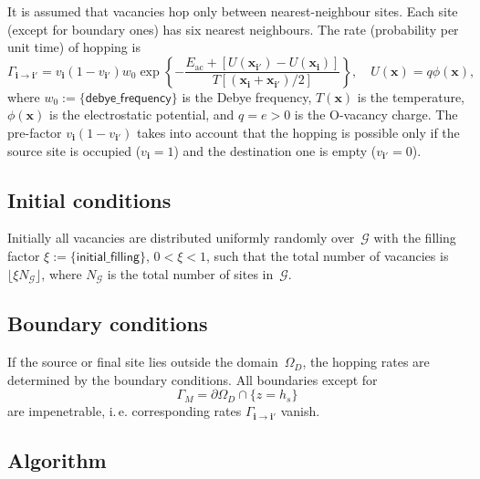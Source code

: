 \documentclass[10pt]{article}
\renewcommand{\vec}[1]{\mathbf{#1}}
\newcommand{\vi}{\vec{i}}
\newcommand{\vx}{\vec{x}}
\begin{document}
It is assumed that vacancies hop only between nearest-neighbour sites. Each site
(except for boundary ones) has six nearest neighbours. The rate (probability per
unit time) of hopping is
\begin{equation}
	\Gamma_{\vi \to \vi'} = v_\vi (1 - v_{\vi'}) w_0
	\exp \left\{
	-\frac{E_{\mathrm{ac}} + [U(\vx_{\vi'}) - U(\vx_\vi)]}
	{T[(\vx_\vi + \vx_{\vi'}) / 2]}
	\right\}, \quad U(\vx) = q \phi(\vx),
\end{equation}
where $w_0 := \{ \mathsf{debye\_frequency} \}$ is the Debye frequency, $T(\vx)$
is the temperature, $\phi(\vx)$ is the electrostatic potential, and $q = e > 0$
is the O-vacancy charge. The pre-factor $v_\vi (1 - v_{\vi'})$ takes into account
that the hopping is possible only if the source site is occupied ($v_\vi = 1$)
and the destination one is empty ($v_{\vi'} = 0$).

\subsection{Initial conditions}

Initially all vacancies are distributed uniformly randomly over~$\mathcal{G}$
with the filling factor $\xi := \{ \mathsf{initial\_filling} \}$,
$0 < \xi < 1$, such that the total number of vacancies is
$\lfloor \xi N_{\mathcal{G}} \rfloor$, where $N_{\mathcal{G}}$ is the total
number of sites in~$\mathcal{G}$.

\subsection{Boundary conditions}

If the source or final site lies outside the domain~$\Omega_D$, the hopping
rates are determined by the boundary conditions. All boundaries except for
\begin{equation}
	\Gamma_M = \partial\Omega_D \cap \{ z = h_s \}
\end{equation}
are impenetrable, i.\,e. corresponding rates $\Gamma_{\vi\to\vi'}$ vanish.

\subsection{Algorithm}
\end{document}
